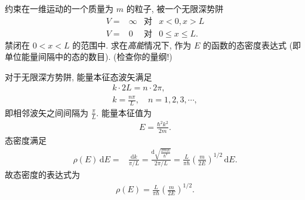 \documentclass{assignment}
\begin{document}
\begin{prob}[课本习题 5.39]
    约束在一维运动的一个质量为 $m$ 的粒子, 被一个无限深势阱
    \begin{align*}
        V=&\infty&\text{对}&x<0,x>L\\
        V=&0&\text{对}&0\leq x\leq L.
    \end{align*}
    禁闭在 $0<x<L$ 的范围中. 求在\textit{高能}情况下, 作为 $E$ 的函数的态密度表达式 (即单位能量间隔中的态的数目). (检查你的量纲!)
\end{prob}
\begin{sol}
    对于无限深方势阱, 能量本征态波矢满足
    \begin{gather}
        k\cdot 2L=n\cdot 2\pi,\\
        k=\frac{n\pi}{L},\quad n=1,2,3,\cdots,
    \end{gather}
    即相邻波矢之间间隔为 $\frac{\pi}{L}$.
    能量本征值为
    \begin{align}
        E=\frac{\hbar^2k^2}{2m}.
    \end{align}
    态密度满足
    \begin{align}
        \rho(E)\,\mathrm{d}E=&\frac{\mathrm{d}k}{\pi/L}=\frac{\mathrm{d}\sqrt{\frac{2mE}{\hbar^2}}}{2\pi/L}=\frac{L}{\pi\hbar}\left(\frac{m}{2E}\right)^{1/2}\,\mathrm{d}E.
    \end{align}
    故态密度的表达式为
    \begin{align}
        \rho(E)=\frac{L}{\pi\hbar}\left(\frac{m}{2E}\right)^{1/2}.
    \end{align}
\end{sol}
\end{document}
